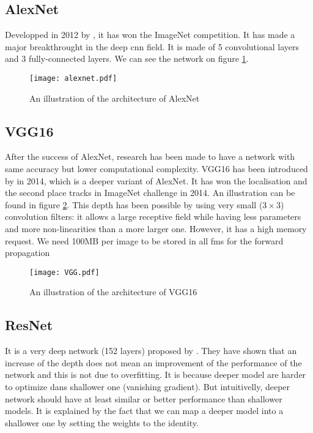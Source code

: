 \subsection{AlexNet}
Developped in 2012 by \textcite{krizhevsky_imagenet_2012}, it has won the ImageNet competition. It has made a major breakthrought in the deep \acrshort{cnn} field. It is made of 5 convolutional layers and 3 fully-connected layers. We can see the network on figure \ref{fig:alexnet}.
%
\begin{figure}
    \centering
    \texttt{[image: alexnet.pdf]}
    \caption{An illustration of the architecture of AlexNet \cite{krizhevsky_imagenet_2012}}
    \label{fig:alexnet}
\end{figure}
%
\subsection{VGG16}
After the success of AlexNet, research has been made to have a network with same accuracy but lower computational complexity. VGG16 has been introduced by \textcite{simonyan_very_2015} in 2014, which is a deeper variant of AlexNet. It has won the localisation and the second place tracks in ImageNet challenge in 2014. An illustration can be found in figure \ref{fig:vgg}. This depth has been possible by using very small ($3 \times 3$) convolution filters: it allows a large receptive field while having less parameters and more non-linearities than a more larger one. However, it has a high memory request. We need 100MB per image to be stored in all \acrshort{fm}s for the forward propagation
%
\begin{figure}
    \centering
    \texttt{[image: VGG.pdf]}
    \caption{An illustration of the architecture of VGG16 \cite{simonyan_very_2015}}
    \label{fig:vgg}
\end{figure}
%
\subsection{ResNet}
It is a very deep network (152 layers) proposed by \textcite{he_deep_2015}. They have shown that an increase of the depth does not mean an improvement of the performance of the network and this is not due to overfitting. It is because deeper model are harder to optimize dans shallower one (vanishing gradient). But intuitivelly, deeper network should have at least similar or better performance than shallower models. It is explained by the fact that we can map a deeper model into a shallower one by setting the weights to the identity.

